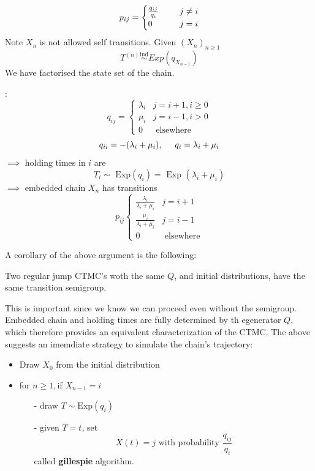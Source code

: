 \documentclass{article}
\begin{document}
\begin{equation*}
	p_{ij}= \begin{cases}
		\frac{q_{ij}}{q_i} \hspace{0.5cm}&j \neq i \\
		0 &j =i
	\end{cases}
\end{equation*}
Note $X_n$ is not allowed self transitions. Given $(X_n)_{n \geqslant 1}$
\begin{equation*}
	T^{(n)}\stackrel{\text{ind}}{\sim} Exp(q_{X_{n-1}})
\end{equation*}
We have factorised the state set of the chain.
\begin{example}
	:
	\[q_{ij} = 
	\begin{cases}
		\lambda_i & j = i+1, i \geqslant 0 \\
		\mu_i & j= i-1, i > 0\\
		0 &\text{ elsewhere}
	\end{cases}
	\]
	\begin{equation}
		q_{ii} = - (\lambda _i + \mu_i), \hspace {0.5 cm} q_i = \lambda _ i + \mu_i
	\end{equation}
	$\implies$ holding times in $i$ are 
	\begin{equation*}
		T_i \sim \text{ Exp} (q_i) = \text{ Exp }(\lambda_i + \mu_i)
	\end{equation*}
	$\implies$ embedded chain $X_n$ has transitions 
	\[p_{ij}
	\begin{cases}
		\frac{\lambda_i}{ \lambda _ i + \mu_i} & j = i+1 \\
		\frac{\mu_i}{ \lambda _ i + \mu_i} & j = i-1 \\
		0 & \text{ elsewhere}
	\end{cases}
	\]
\end{example}
A corollary of the above argument is the following:
\begin{proposition}
	Two regular jump CTMC's woth the same $Q$, and initial distributions, have the same transition semigroup.
\end{proposition}
This is important since we know we can proceed even without the semigroup. Embedded chain and holding times are fully determined by th egenerator $Q$, which therefore provides an equivalent characterization of the CTMC. The above suggests an imemdiate strategy to simulate the chain's trajectory:
\begin{itemize}
	\item Draw $X_0$ from the initial distribution
	\item for $n \geqslant 1, $if $X_{n-1} = i$
	\begin{itemize}
		\item [-] draw $T \sim \text{Exp}(q_i)$
		\item [-] given $T = t$, set
		\begin{equation*}
			X(t) = j \text{ with probability } \frac{q_{ij}}{q_i}
		\end{equation*}
		called \textbf{gillespie} algorithm.
	\end{itemize}
\end{itemize}
\end{document}
